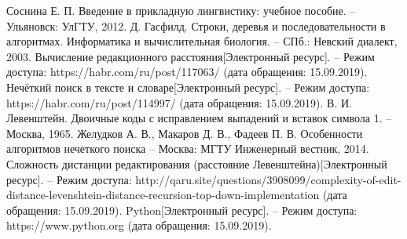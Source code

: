 \documentclass[a4paper,14pt]{article} %
\begin{document}
        \begin{thebibliography}{}
        		\bibitem{} Соснина Е. П. Введение в прикладную лингвистику: учебное пособие. -- Ульяновск: УлГТУ, 2012.
		\bibitem{} Д. Гасфилд. Строки, деревья и последовательности в алгоритмах. Информатика и вычислительная биология. -- СПб.: Невский диалект, 2003.
		\bibitem{} Вычисление редакционного расстояния[Электронный ресурс]. -- Режим доступа: https://habr.com/ru/post/117063/ (дата обращения: 15.09.2019).
		\bibitem{} Нечёткий поиск в тексте и словаре[Электронный ресурс]. -- Режим доступа: https://habr.com/ru/post/114997/ (дата обращения: 15.09.2019).
		\bibitem{} В. И. Левенштейн. Двоичные коды с исправлением выпадений и вставок символа 1. -- Москва, 1965. 
		\bibitem{} Желудков А. В., Макаров Д. В., Фадеев П. В. Особенности алгоритмов нечеткого поиска -- Москва: МГТУ Инженерный вестник, 2014. 
		\bibitem{} Сложность дистанции редактирования (расстояние Левенштейна)[Электронный ресурс]. -- Режим доступа: http://qaru.site/questions/3908099/complexity-of-edit-distance-levenshtein-distance-recursion-top-down-implementation (дата обращения: 15.09.2019).
		\bibitem{} Python[Электронный ресурс]. -- Режим доступа: https://www.python.org (дата обращения: 15.09.2019).
	\end{thebibliography} 
\end{document}
